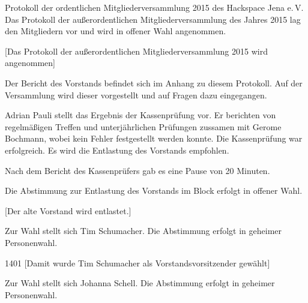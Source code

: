 \documentclass[ngerman]{scrartcl}
\begin{document}
\begin{Protokoll}{Protokoll der ordentlichen Mitgliederversammlung 2015 des Hackspace Jena e.\,V.}
Das Protokoll der außerordentlichen Mitgliederversammlung des Jahres
2015 lag den Mitgliedern vor und wird in offener Wahl angenommen.

\begin{Abstimmung}
  [Das Protokoll der außerordentlichen Mitgliederversammlung 2015 wird angenommen]
\end{Abstimmung}


Der Bericht des Vorstands befindet sich im Anhang zu diesem
Protokoll. Auf der Versammlung wird dieser vorgestellt und auf Fragen
dazu eingegangen.



Adrian Pauli stellt das Ergebnis der Kassenprüfung vor. Er berichten
von regelmäßigen Treffen und unterjährlichen Prüfungen zussamen mit
Gerome Bochmann, wobei kein Fehler festgestellt werden konnte. Die
Kassenprüfung war erfolgreich. Es wird die Entlastung des Vorstands
empfohlen.

Nach dem Bericht des Kassenprüfers gab es eine Pause von 20 Minuten.


Die Abstimmung zur Entlastung des Vorstands im Block erfolgt in offener Wahl.
\begin{Abstimmung}
  [Der alte Vorstand wird entlastet.]
\end{Abstimmung}




Zur Wahl stellt sich Tim Schumacher. Die Abstimmung erfolgt in geheimer
Personenwahl.

\begin{Abstimmung}
  {14}{0}{1}
  [Damit wurde Tim Schumacher als Vorstandsvorsitzender gewählt]
\end{Abstimmung}



Zur Wahl stellt sich Johanna Schell. Die Abstimmung erfolgt in geheimer Personenwahl.


\end{Protokoll}
\end{document}
